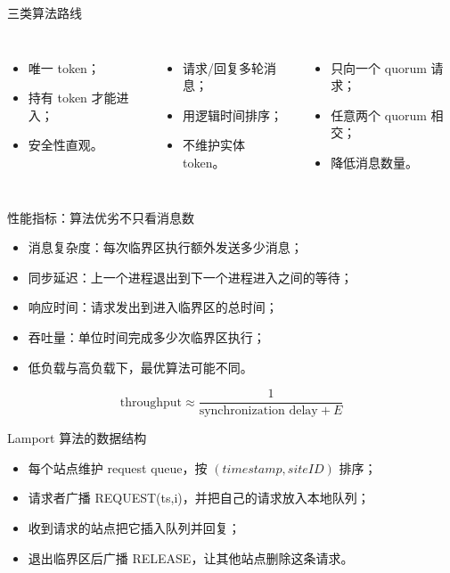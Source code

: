 \documentclass[UTF8,fontset=none,aspectratio=169,10pt]{beamer}
\begin{document}
\begin{frame}{三类算法路线}
\begin{columns}[T]
\begin{itemize}\item 唯一 token；\item 持有 token 才能进入；\item 安全性直观。\end{itemize}
\begin{itemize}\item 请求/回复多轮消息；\item 用逻辑时间排序；\item 不维护实体 token。\end{itemize}
\begin{itemize}\item 只向一个 quorum 请求；\item 任意两个 quorum 相交；\item 降低消息数量。\end{itemize}
\end{columns}
\vfill
{}
\end{frame}

\begin{frame}{性能指标：算法优劣不只看消息数}
\begin{itemize}
  \item 消息复杂度：每次临界区执行额外发送多少消息；
  \item 同步延迟：上一个进程退出到下一个进程进入之间的等待；
  \item 响应时间：请求发出到进入临界区的总时间；
  \item 吞吐量：单位时间完成多少次临界区执行；
  \item 低负载与高负载下，最优算法可能不同。
\end{itemize}
\vfill
\[
\text{throughput}\approx\frac{1}{\text{synchronization delay}+E}
\]
\end{frame}


\begin{frame}{Lamport 算法的数据结构}
\begin{itemize}
  \item 每个站点维护 request queue，按 $(timestamp, siteID)$ 排序；
  \item 请求者广播 REQUEST(ts,i)，并把自己的请求放入本地队列；
  \item 收到请求的站点把它插入队列并回复；
  \item 退出临界区后广播 RELEASE，让其他站点删除这条请求。
\end{itemize}
\end{frame}
\end{document}
